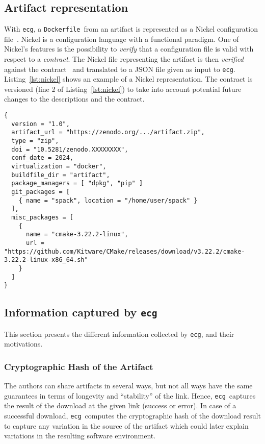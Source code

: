 \documentclass[sigconf,natbib=false]{acmart}
\newcommand{\df}{\texttt{Dockerfile}}
\newcommand{\ecg}{\texttt{ecg}}
\begin{document}
\subsection{Artifact representation}\label{sec:nickel}

With \ecg, a \df\ from an artifact is represented as a Nickel configuration file~\cite{nickel}.
Nickel is a configuration language with a functional paradigm.
One of Nickel's features is the possibility to \emph{verify} that a configuration file is valid with respect to a \emph{contract}.
The Nickel file representing the artifact is then \emph{verified} against the contract~\cite{ecg_contract} and translated to a JSON file given as input to \ecg.
Listing~\ref{lst:nickel} shows an example of a Nickel representation.
The contract is versioned (line 2 of Listing~\ref{lst:nickel}) to take into account potential future changes to the descriptions and the contract.

\begin{lstlisting}[caption=Example of Artifact representation in Nickel, label=lst:nickel]
{
  version = "1.0",
  artifact_url = "https://zenodo.org/.../artifact.zip",
  type = "zip",
  doi = "10.5281/zenodo.XXXXXXXX",
  conf_date = 2024,
  virtualization = "docker",
  buildfile_dir = "artifact",
  package_managers = [ "dpkg", "pip" ]
  git_packages = [
    { name = "spack", location = "/home/user/spack" }
  ],
  misc_packages = [
    {
      name = "cmake-3.22.2-linux",
      url = "https://github.com/Kitware/CMake/releases/download/v3.22.2/cmake-3.22.2-linux-x86_64.sh"
    }
  ]
}
\end{lstlisting}


\subsection{Information captured by \ecg}\label{sec:ecg:capture}

This section presents the different information collected by \ecg, and their motivations.

\subsubsection{Cryptographic Hash of the Artifact}

The authors can share artifacts in several ways, but not all ways have the same guarantees in terms of longevity and ``stability'' of the link.
Hence, \ecg\ captures the result of the download at the given link (success or error).
In case of a successful download, \ecg\ computes the cryptographic hash of the download result to capture any variation in the source of the artifact which could later explain variations in the resulting software environment.
\end{document}
